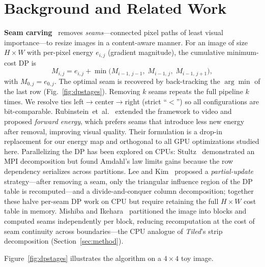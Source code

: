 \section{Background and Related Work}

\textbf{Seam carving}~\cite{avidan2007} removes \emph{seams}---connected
pixel paths of least visual importance---to resize images in a
content-aware manner. For an image of size $H\!\times\!W$ with per-pixel energy
$e_{i,j}$ (gradient magnitude), the cumulative minimum-cost DP is
\begin{equation}
M_{i,j} = e_{i,j} + \min\!\bigl(M_{i-1,\,j-1},\;M_{i-1,\,j},\;M_{i-1,\,j+1}\bigr),
\label{eq:dp}
\end{equation}
with $M_{0,j}=e_{0,j}$. The optimal seam is recovered by back-tracking the
$\arg\min$ of the last row (Fig.~\ref{fig:dpstages}). Removing $k$ seams
repeats the full pipeline $k$ times. We resolve ties
left$\to$center$\to$right (strict ``$<$'') so all configurations are
bit-comparable.
Rubinstein~et~al.~\cite{rubinstein2008} extended the framework to video and
proposed \emph{forward energy}, which prefers seams that introduce less new
energy after removal, improving visual quality. Their formulation is a drop-in
replacement for our energy map and orthogonal to all GPU optimizations studied here.
Parallelizing the DP has been explored on CPUs: Stultz~\cite{stultz2008}
demonstrated an MPI decomposition but found Amdahl's law limits gains because
the row dependency serializes across partitions.
Lee and Kim~\cite{lee2009} proposed a \emph{partial-update} strategy---after
removing a seam, only the triangular influence region of the DP table is
recomputed---and a divide-and-conquer column decomposition; together these
halve per-seam DP work on CPU but require retaining the full $H{\times}W$
cost table in memory.
Mishiba and Ikehara~\cite{mishiba2011} partitioned the image into
blocks and computed seams independently per block, reducing recomputation
at the cost of seam continuity across boundaries---the CPU analogue of
\emph{Tiled}'s strip decomposition (Section~\ref{sec:method}).

Figure~\ref{fig:dpstages} illustrates the algorithm on a $4\times4$ toy image.

